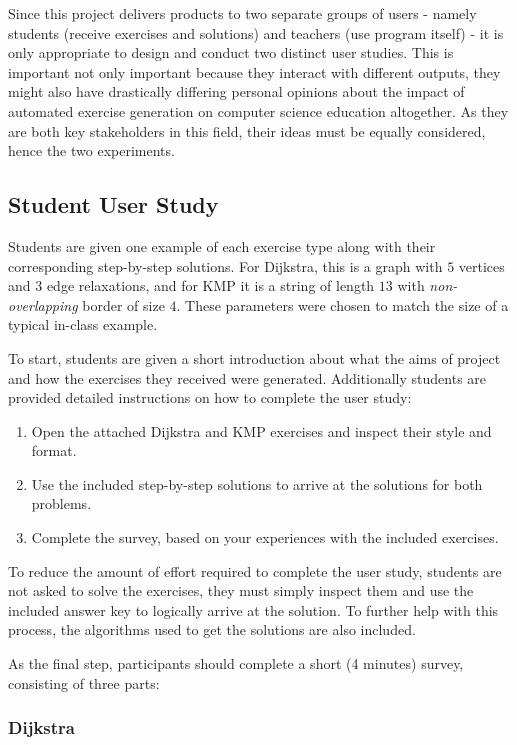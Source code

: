 \documentclass{l4proj}
\begin{document}
Since this project delivers products to two separate groups of users - namely students (receive exercises and solutions) and teachers (use program itself) - it is only appropriate to design and conduct two distinct user studies. This is important not only important because they interact with different outputs, they might also have drastically differing personal opinions about the impact of automated exercise generation on computer science education altogether. As they are both key stakeholders in this field, their ideas must be equally considered, hence the two experiments.

\subsection{Student User Study}

Students are given one example of each exercise type along with their corresponding step-by-step solutions. For Dijkstra, this is a graph with $5$ vertices and $3$ edge relaxations, and for KMP it is a string of length $13$ with \emph{non-overlapping} border of size $4$. These parameters were chosen to match the size of a typical in-class example. 

To start, students are given a short introduction about what the aims of project and how the exercises they received were generated. Additionally students are provided detailed instructions on how to complete the user study:
\begin{enumerate}
	\item
	Open the attached Dijkstra and KMP exercises and inspect their style and format.
	\item
	Use the included step-by-step solutions to arrive at the solutions for both problems.
	\item
	Complete the survey, based on your experiences with the included exercises.
\end{enumerate}

To reduce the amount of effort required to complete the user study, students are not asked to solve the exercises, they must simply inspect them and use the included answer key to logically arrive at the solution. To further help with this process, the algorithms used to get the solutions are also included.

As the final step, participants should complete a short (4 minutes) survey, consisting of three parts:

\subsubsection{Dijkstra}
\end{document}
